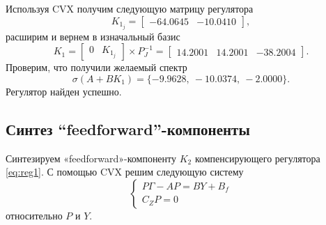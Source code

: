 Используя CVX получим следующую матрицу регулятора
\begin{equation*}
    K_{1_j}=\begin{bmatrix}
        -64.0645&-10.0410
    \end{bmatrix},
\end{equation*}
расширим и вернем в изначальный базис
\begin{equation*}
    K_1=\begin{bmatrix}
        0&K_{1_j}
    \end{bmatrix}\times P_J^{-1}=
    \begin{bmatrix}
        14.2001&	14.2001&	-38.2004
    \end{bmatrix}.
\end{equation*}
Проверим, что получили желаемый спектр
\begin{equation*}
    \sigma(A+BK_1)=\{-9.9628,\    -10.0374,\    -2.0000\}.
\end{equation*}
Регулятор найден успешно.


\subsection{Синтез ``feedforward''-компоненты}

Синтезируем «feedforward»-компоненту $K_2$ компенсирующего регулятора \eqref{eq:reg1}.
С помощью CVX решим следующую систему
\begin{equation*}
    \begin{cases}
        P\Gamma-AP=BY+B_f\\
        C_ZP=0
    \end{cases}
\end{equation*}
относительно $P$ и $Y$.